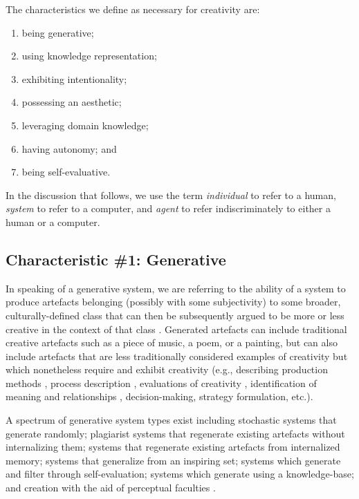 \documentclass[phd,electronic,oneside,twosidetoc,letterpaper,chaptercenter,parttop,lol,lof,lot]{byumsphd}
\begin{document}
The characteristics we define as necessary for creativity are:
\begin{enumerate}
\item being generative; 
\item using knowledge representation; 
\item exhibiting intentionality;
\item possessing an aesthetic;
\item leveraging domain knowledge; 
\item having autonomy; and
\item being self-evaluative. 
\end{enumerate}
\noindent In the discussion that follows, we use the term \textit{individual} to refer to a human, \textit{system} to refer to a computer, and \textit{agent} to refer indiscriminately to either a human or a computer.

\subsection{Characteristic \#1: Generative}

In speaking of a generative system, we are referring to the ability of a system to produce artefacts belonging (possibly with some subjectivity) to some broader, culturally-defined class that can then be subsequently argued to be more or less creative in the context of that class \citep{Wiggins2006ASystems}. Generated artefacts can include traditional creative artefacts such as a piece of music, a poem, or a painting, but can also include artefacts that are less traditionally considered examples of creativity but which nonetheless require and exhibit creativity (e.g., describing production methods \citep{Ritchie2007}, process description \citep{Colton2008CreativitySystems}, evaluations of creativity \citep{Colton2011}, identification of meaning and relationships \citep{norton2013finding}, decision-making, strategy formulation, etc.).

A spectrum of generative system types exist including stochastic systems that generate randomly; plagiarist systems that regenerate existing artefacts without internalizing them; systems that regenerate existing artefacts from internalized memory; systems that generalize from an inspiring set; systems which generate and filter through self-evaluation; systems which generate using a knowledge-base; and creation with the aid of perceptual faculties \citep{Ventura2016}.
\end{document}
